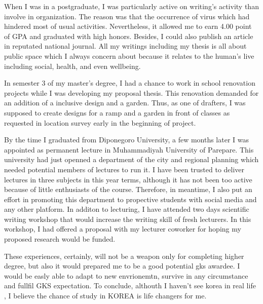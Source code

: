 \documentclass[11pt]{simart} %
\begin{document}
When I was in a postgraduate, I was particularly active on writing's activity than involve in organization. The reason was that the occurrence of virus which had hindered most of usual activities. Nevertheless, it allowed me to earn 4.00 point of GPA and graduated with high honors. Besides, I could also publish an article in reputated national journal. All my writings including my thesis is all about public space which I always concern about because it relates to the human's live including social, health, and even wellbeing.

In semester 3 of my master's degree, I had a chance to work in school renovation projects while I was developing my proposal thesis. This renovation demanded for an addition of a inclusive design and a garden. Thus, as one of drafters, I was supposed to create designs for a ramp and a garden in front of classes as requested in location survey early in the beginning of project. %

By the time I graduated from Diponegoro University, a few months later I was appointed as permanent lecture in Muhammadiyah University of Parepare.
This university had just openned a department of the city and regional planning which needed potential members of lectures to run it.
I have been trusted to deliver lectures in three subjects in this year terms, although it has not been too active because of little enthusiasts of the course.
Therefore, in meantime, I also put an effort in promoting this department to propective students with social media and any other platform.
In additon to lecturing, I have attended two days scientific writing workshop that would increase the writing skill of fresh lecturers. In this workshop, I had offered a proposal with my lecturer coworker for hoping my proposed research would be funded.

These experiences, certainly, will not be a weapon only for completing higher degree, but also it would prepared me to be a good potential gks awardee. I would be easly able to adapt to new envrionemtn, survive in any circumstance and fullfil GKS expectation. To conclude, althouth I haven't see korea in real life , I believe the chance of study in KOREA is life changers for me.
















%

%
\end{document}

